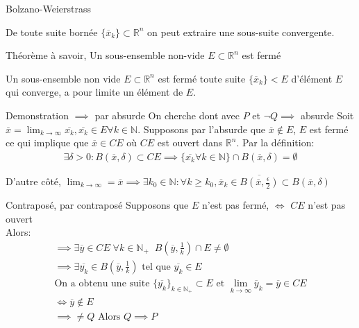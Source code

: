 \begin{parag}{Bolzano-Weierstrass}
    \begin{theoreme}
        De toute suite bornée $\{ \overline{x}_k\} \subset \mathbb{R}^n $ on peut extraire une sous-suite convergente.
    \end{theoreme}
    

\end{parag}
\begin{parag}{Théorème à savoir, Un sous-ensemble non-vide $E \subset \mathbb{R}^n $ est fermé}
\begin{theoreme}
    Un sous-ensemble non vide $E \subset \mathbb{R}^n $ est fermé  toute suite $\{ \overline{x}_k\} < E$ d'élément $E$ qui converge, a pour limite un élément de $E$.
\end{theoreme}
\begin{subparag}{Demonstration $ \implies$ par absurde}
    On cherche dont avec $P$ et $ \neg Q \implies$ absurde
    Soit $ \overline{x} = \lim_{k \to\infty} \overline{x_k}, \overline{x_k} \in E \forall k \in \mathbb{N} $. Supposons par l'absurde que $ \overline{x} \notin E$, $E$ est fermé \\
    ce qui implique que $ \overline{x} \in CE$ où $CE$ est ouvert dans $ \mathbb{R}^n $. Par la définition:
    \begin{align*}
        \exists \delta > 0: B( \overline{x}, \delta) \subset CE \implies \{ \overline{x_k} \forall k \in \mathbb{N}\} \cap B( \overline{x}, \delta) = \emptyset
    \end{align*}
    
    D'autre côté, $ \lim_{k \to \infty} = \overline{x} \implies \exists k_0 \in \mathbb{N}: \forall k \geq k_0, \overline{x}_k \in \overline{B( \overline{x}, \frac{ \epsilon}{2})} \subset B( \overline{x}, \delta)$
\end{subparag}
\begin{subparag}{Contraposé, par contraposé}
    Supposons que $E$ n'est pas fermé, $ \iff$ $CE$ n'est pas ouvert\\
    Alors:
    \begin{align*}
        \implies \exists \overline{y} \in CE \; \forall k \in \mathbb{N}_+ \; \;B( \overline{y}, \frac{1}{k}) \cap E \neq \emptyset\\
        \implies \exists \overline{y_k} \in B( \overline{y}, \frac{1}{k}) \text{ tel que } \overline{y_k} \in E \\
        \text{On a obtenu une suite } \{ \overline{y_k}\}_{k \in \mathbb{N}_+} \subset E \text{ et } \lim_{k \to \infty} \overline{y}_k = \overline{y} \in CE \\
        \iff \overline{y} \notin E\\
        \implies \neq Q \text{ Alors } Q \implies P
    \end{align*}
    


\end{subparag}
\end{parag}
